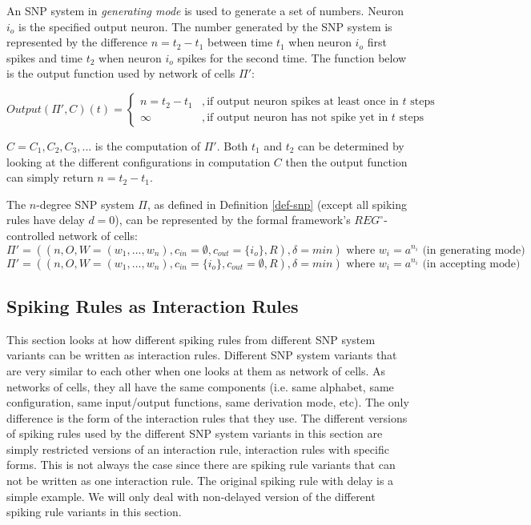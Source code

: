 \documentclass[a4paper]{article}
\theoremstyle{definition}
\begin{document}
An SNP system in \emph{generating mode} is used to generate a set of numbers. Neuron $i_o$ is the
specified output neuron. The number generated by the SNP system is represented by the difference
$n = t_2 - t_1$ between time $t_1$ when neuron $i_o$ first spikes and time $t_2$ when neuron $i_o$
spikes for the second time. The function below is the output function used by network of cells 
$\Pi'$:

\[
Output(\Pi',C)(t) = 
\begin{cases}
n = t_2 - t_1 &, \text{if output neuron spikes at least once in $t$ steps}\\
\infty        &, \text{if output neuron has not spike yet in $t$ steps} 
\end{cases}
\]

$C = C_1, C_2,C_3,...$ is the computation of $\Pi'$. Both $t_1$ and $t_2$ can be determined by 
looking at the different configurations in computation $C$ then the output function can simply 
return $n = t_2 -t_1$. 

The $n$-degree SNP system $\Pi$, as defined in Definition \ref{def-snp} (except all spiking rules 
have delay $d=0$), can be represented by the formal framework's $REG^{\circ}$-controlled network of 
cells:
$$\Pi'= ((n,O,W=(w_1,...,w_n),c_{in}=\emptyset, c_{out}=\{i_o\}, R),\delta=min) 
\text{ where } w_i = a^{n_i} \text{ (in generating mode)}$$ 
$$\Pi'= ((n,O,W=(w_1,...,w_n), c_{in}=\{i_o\}, c_{out}=\emptyset, R),\delta=min) 
\text{ where } w_i = a^{n_i} \text{ (in accepting mode)}$$ 


\subsection{Spiking Rules as Interaction Rules}

This section looks at how different spiking rules from different SNP system variants can be written 
as interaction rules. Different SNP system variants that are very similar to each other when one
looks at them as network of cells. As networks of cells, they all have the same components (i.e. 
same alphabet, same configuration, same input/output functions, same derivation mode, etc). The only 
difference is the form of the interaction rules that they use. The different versions of spiking 
rules used by the different SNP system variants in this section are simply restricted versions of an 
interaction rule, interaction rules with specific forms. This is not always the case since there are
spiking rule variants that can not be written as one interaction rule. The original spiking rule 
with delay is a simple example. We will only deal with non-delayed version of the different spiking 
rule variants in this section.
\end{document}
